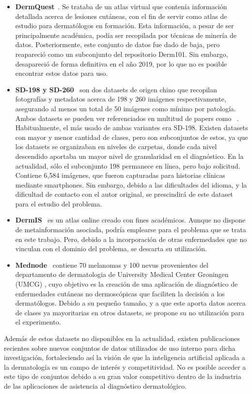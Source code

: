 \begin{itemize}
	\item \textbf{DermQuest}~\cite{dermquest}. Se trataba de un atlas virtual que contenía información detallada acerca de lesiones cutáneas, con el fin de servir como atlas de estudio para dermatólogos en formación. Esta información, a pesar de ser principalmente académica, podía ser recopilada por técnicas de minería de datos.  Posteriormente, este conjunto de datos fue dado de baja, pero reapareció como un subconjunto del repositorio Derm101. Sin embargo, desapareció de forma definitiva en el año 2019, por lo que no es posible encontrar estos datos para uso.
	
	\item \textbf{SD-198 y SD-260}~\cite{10.1007/978-3-319-46466-4_13} son dos datasets de origen chino que recopilan fotografías y metadatos acerca de 198 y 260 imágenes respectivamente, asegurando al menos un total de 50 imágenes como mínimo por patología. Ambos datasets se pueden ver referenciados en multitud de papers como ~\cite{goyal2020artificial}. Habitualmente, el más usado de ambas variantes era SD-198. Existen datasets con mayor y menor cantidad de clases, pero son subconjuntos de estos, ya que los datasets se organizaban en niveles de carpetas, donde cada nivel descendido aportaba un mayor nivel de granularidad en el diagnóstico. En la actualidad, sólo el subconjunto 198 permanece en línea, pero bajo solicitud. Contiene 6,584 imágenes, que fueron capturadas para historias clínicas mediante smartphones. Sin embargo, debido a las dificultades del idioma, y la dificultad de contacto con el autor original, se prescindirá de este dataset para el estudio del problema.
	\item \textbf{DermIS}~\cite {dermis} es un atlas online creado con fines académicos. Aunque no dispone de metainformación asociada, podría emplearse para el  problema que se trata en este trabajo. Pero, debido a la incorporación de otras enfermedades que no vinculan con el dominio del problema, se descarta su utilización.
	\item \textbf{Mednode}~\cite{GIOTIS20156578} contiene 70 melanomas y 100 nevus provenientes del  departamento de dermatologia de University Medical Center Groningen (UMCG) , cuyo objetivo es la creación de una aplicación de diagnóstico de enfermedades cutáneas no dermoscópicas que faciliten la decisión a los dermatólogos. Debido a su pequeño tamaño, y a que este aporta datos acerca de clases ya mayoritarias en otros datasets, se propone su no utilización para el experimento.
\end{itemize}

Además de estos datasets no disponibles en la actualidad, existen publicaciones recientes sobre nuevos conjuntos de datos utilizados de uso interno para dicha investigación, fortaleciendo así la visión de que la inteligencia artificial aplicada a la dermatología es un campo de interés y competitividad. No es posible acceder a este tipo de conjuntos debido a su gran valor competitivo dentro de la industria  de las aplicaciones de asistencia al diagnóstico dermatológico.